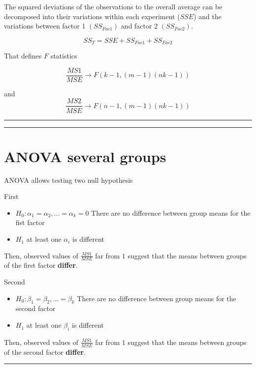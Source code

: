 \documentclass[
]{book}
\begin{document}
The squared deviations of the observations to the overall average can be decomposed into their variations within each experiment (\(SSE\)) and the variations between factor 1 \((SS_{Fac1})\) and factor 2 \((SS_{Fac2})\).

\[SS_T= SSE + SS_{Fac1} + SS_{Fac2}\]

That defines \(F\) statistics

\[\frac{MS1}{MSE} \rightarrow F(k-1,(m-1)(nk-1))\]

and \[\frac{MS2}{MSE}\rightarrow F(n-1,(m-1)(nk-1))\]

\begin{center}\rule{0.5\linewidth}{0.5pt}\end{center}

\begin{center}\rule{0.5\linewidth}{0.5pt}\end{center}

\hypertarget{anova-several-groups-5}{%
\section{ANOVA several groups}\label{anova-several-groups-5}}

ANOVA allows testing two null hypothesis

First

\begin{itemize}
\item
  \(H_0: \alpha_1=\alpha_2, ...=\alpha_k=0\) There are no difference between group means for the fist factor
\item
  \(H_1\) at least one \(\alpha_i\) is different
\end{itemize}

Then, observed values of \(\frac{MS1}{MSE}\) far from \(1\) suggest that the means between groups of the first factor \textbf{differ}.

Second

\begin{itemize}
\item
  \(H_0: \beta_1=\beta_2, ...=\beta_k\) There are no difference between group means for the second factor
\item
  \(H_1\) at least one \(\beta_i\) is different
\end{itemize}

Then, observed values of \(\frac{MS1}{MSE}\) far from \(1\) suggest that the means between groups of the second factor \textbf{differ}.

\begin{center}\rule{0.5\linewidth}{0.5pt}\end{center}
\end{document}
